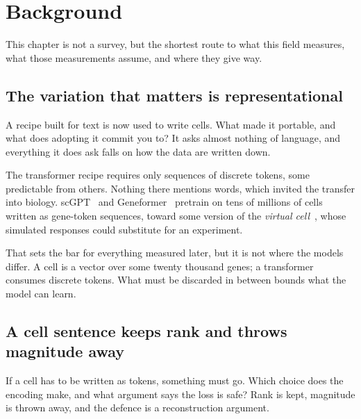 
\chapter{Background}
\label{sec:litreview}

\noindent
This chapter is not a survey, but the shortest route to what this field measures,
what those measurements assume, and where they give way.

\section{The variation that matters is representational}
\label{sec:lit-foundation}
\framedecl{-}

\begin{question}
A recipe built for text is now used to write cells. What made it portable, and
what does adopting it commit you to? It asks almost nothing of language, and
everything it does ask falls on how the data are written down.
\end{question}

\noindent
The transformer recipe requires only sequences of discrete tokens, some
predictable from others. Nothing there mentions words, which invited the transfer
into biology. scGPT~\cite{scgpt} and Geneformer~\cite{geneformer} pretrain on
tens of millions of cells written as gene-token sequences, toward some version of
the \emph{virtual cell}~\cite{bunne}, whose simulated responses could substitute
for an experiment.

That sets the bar for everything measured later, but it is not where the models
differ. A cell is a vector over some twenty thousand genes; a transformer
consumes discrete tokens. What must be discarded in between bounds what the model
can learn.

\section{A cell sentence keeps rank and throws magnitude away}
\label{sec:lit-c2s}
\framedecl{-}

\begin{question}
If a cell has to be written as tokens, something must go. Which choice does the
encoding make, and what argument says the loss is safe? Rank is kept, magnitude
is thrown away, and the defence is a reconstruction argument.
\end{question}


